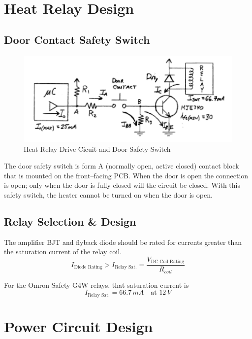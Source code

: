 \documentclass[10pt, twocolumn]{article}
\begin{document}
\section{Heat Relay Design}

\subsection{Door Contact Safety Switch}

\begin{figure}
	\centering
	\includegraphics[width=\columnwidth]{Figures/relay-drive-circuit.pdf}
	\caption{Heat Relay Drive Cicuit and Door Safety Switch}
	\label{relay-drive-circuit}
\end{figure}

The door safety switch is form A (normally open, active closed) contact block that is
mounted on the front--facing PCB. When the door is open the connection is open;
only when the door is fully closed will the circuit be closed. With this safety switch,
the heater cannot be turned on when the door is open.

\subsection{Relay Selection \& Design}

The amplifier BJT and flyback diode should be rated for currents greater than the saturation
current of the relay coil.
\begin{equation}
I_{\textrm{Diode Rating}}>I_{\textrm{Relay Sat.}}=\frac{V_{\textrm{DC Coil Rating}}}{R_{coil}}
\end{equation}

For the Omron Safety G4W relays, that saturation current is
\begin{equation}
I_{\textrm{Relay Sat.}}=66.7\,mA\quad\textrm{at }12\,V
\end{equation}

\section{Power Circuit Design}
\end{document}
